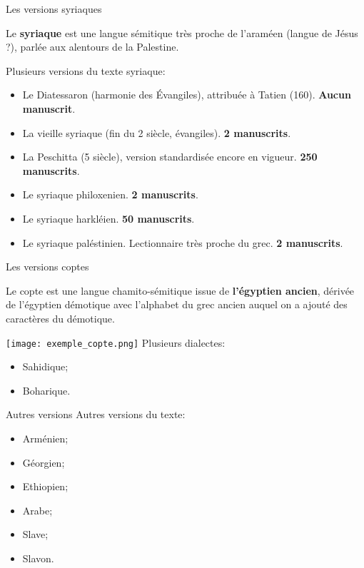 \documentclass[11pt]{beamer}
\begin{document}
\begin{frame}{Les versions syriaques}
    \begin{alertblock}{}
    Le \textbf{syriaque} est une langue sémitique très proche de l'araméen (langue de Jésus ?), parlée aux alentours de la Palestine.
    \end{alertblock}
    Plusieurs versions du texte syriaque:
    \begin{itemize}
        \item Le Diatessaron (harmonie des Évangiles), attribuée à Tatien (160). \textbf{Aucun manuscrit}.
        \item La vieille syriaque (fin du 2\ieme{} siècle, évangiles). \textbf{2 manuscrits}.
        \item La Peschitta (5\ieme{} siècle), version standardisée encore en vigueur. \textbf{250 manuscrits}.
        \item Le syriaque philoxenien. \textbf{2 manuscrits}.
        \item Le syriaque harkléien. \textbf{50 manuscrits}.
        \item Le syriaque paléstinien. Lectionnaire très proche du grec. \textbf{2 manuscrits}.
    \end{itemize}
\end{frame}

\begin{frame}{Les versions coptes}
\begin{alertblock}{}
    Le copte est une langue chamito-sémitique issue de \textbf{l'égyptien ancien}, dérivée de l'égyptien démotique avec l'alphabet du grec ancien auquel on a ajouté des caractères du démotique.
\end{alertblock}
\centering
    \texttt{[image: exemple\_copte.png]}
\flushleft
Plusieurs dialectes:
\begin{itemize}
    \item Sahidique;
    \item Boharique.
\end{itemize}
\end{frame}

\begin{frame}{Autres versions}
Autres versions du texte:
    \begin{itemize}
        \item Arménien;
        \item Géorgien;
        \item Ethiopien;
        \item Arabe;
        \item Slave;
        \item Slavon.
    \end{itemize}
\end{frame}
\end{document}
